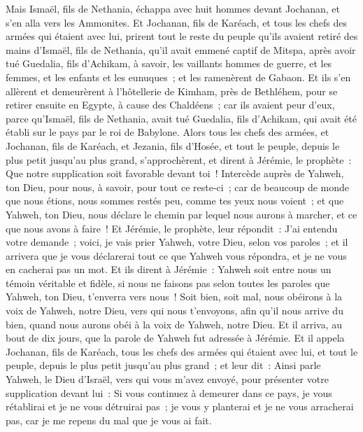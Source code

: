 \begin{multicols}{2}
Mais Ismaël, fils de Nethania, échappa avec huit hommes devant Jochanan, et s'en alla vers les Ammonites.
Et Jochanan, fils de Karéach, et tous les chefs des armées qui étaient avec lui, prirent tout le reste du peuple qu'ils avaient retiré des mains d'Ismaël, fils de Nethania, qu'il avait emmené captif de Mitspa, après avoir tué Guedalia, fils d'Achikam, à savoir, les vaillants hommes de guerre, et les femmes, et les enfants et les eunuques~; et les ramenèrent de Gabaon.
Et ils s'en allèrent et demeurèrent à l'hôtellerie de Kimham, près de Bethléhem, pour se retirer ensuite en Egypte,
à cause des Chaldéens~; car ils avaient peur d'eux, parce qu'Ismaël, fils de Nethania, avait tué Guedalia, fils d'Achikam, qui avait été établi sur le pays par le roi de Babylone.
\VerseOne{}Alors tous les chefs des armées, et Jochanan, fils de Karéach, et Jezania, fils d'Hosée, et tout le peuple, depuis le plus petit jusqu'au plus grand, s'approchèrent,
et dirent à Jérémie, le prophète~: Que notre supplication soit favorable devant toi~! Intercède auprès de Yahweh, ton Dieu, pour nous, à savoir, pour tout ce reste-ci~; car de beaucoup de monde que nous étions, nous sommes restés peu, comme tes yeux nous voient~;
et que Yahweh, ton Dieu, nous déclare le chemin par lequel nous aurons à marcher, et ce que nous avons à faire~!
Et Jérémie, le prophète, leur répondit~: J'ai entendu votre demande~; voici, je vais prier Yahweh, votre Dieu, selon vos paroles~; et il arrivera que je vous déclarerai tout ce que Yahweh vous répondra, et je ne vous en cacherai pas un mot.
Et ils dirent à Jérémie~: Yahweh soit entre nous un témoin véritable et fidèle, si nous ne faisons pas selon toutes les paroles que Yahweh, ton Dieu, t'enverra vers nous~!
Soit bien, soit mal, nous obéirons à la voix de Yahweh, notre Dieu, vers qui nous t'envoyons, afin qu'il nous arrive du bien, quand nous aurons obéi à la voix de Yahweh, notre Dieu.
Et il arriva, au bout de dix jours, que la parole de Yahweh fut adressée à Jérémie.
Et il appela Jochanan, fils de Karéach, tous les chefs des armées qui étaient avec lui, et tout le peuple, depuis le plus petit jusqu'au plus grand~;
et leur dit~: Ainsi parle Yahweh, le Dieu d'Israël, vers qui vous m'avez envoyé, pour présenter votre supplication devant lui~:
Si vous continuez à demeurer dans ce pays, je vous rétablirai et je ne vous détruirai pas~; je vous y planterai et je ne vous arracherai pas, car je me repens du mal que je vous ai fait.

\end{multicols}
